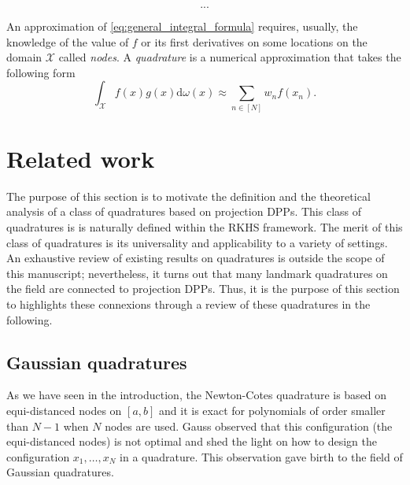 \documentclass[twoside,11pt]{book}
\begin{document}
\begin{equation}
...
\end{equation} 



An approximation of \eqref{eq:general_integral_formula} requires, usually, the knowledge of the value of $f$ or its first derivatives on some locations on the domain $\mathcal{X}$ called \emph{nodes}. A \emph{quadrature} is a numerical approximation that takes the following form
\begin{equation}
\int_{\mathcal{X}}f(x)g(x)\mathrm{d}\omega(x)   \approx \sum\limits_{n \in [N]}w_{n}f(x_{n}).
\end{equation}


\section{Related work}
The purpose of this section is to motivate the definition and the theoretical analysis of a class of quadratures based on projection DPPs. This class of quadratures is is naturally defined within the RKHS framework. The merit of this class of quadratures is its universality and applicability to a variety of settings. An exhaustive review of existing results on quadratures is outside the scope of this manuscript; nevertheless, it turns out that many landmark quadratures on the field are connected to projection DPPs. 
Thus, it is the purpose of this section to highlights these connexions through a review of these quadratures in the following.







\subsection{Gaussian quadratures}
As we have seen in the introduction, the Newton-Cotes quadrature is based on equi-distanced nodes on $[a,b]$ and it is exact for polynomials of order smaller than $N-1$ when $N$ nodes are used. Gauss observed that this configuration (the equi-distanced nodes) is not optimal and shed the light on how to design the configuration $x_{1}, \dots, x_{N}$ in a quadrature. This observation gave birth to the field of Gaussian quadratures.
\end{document}
